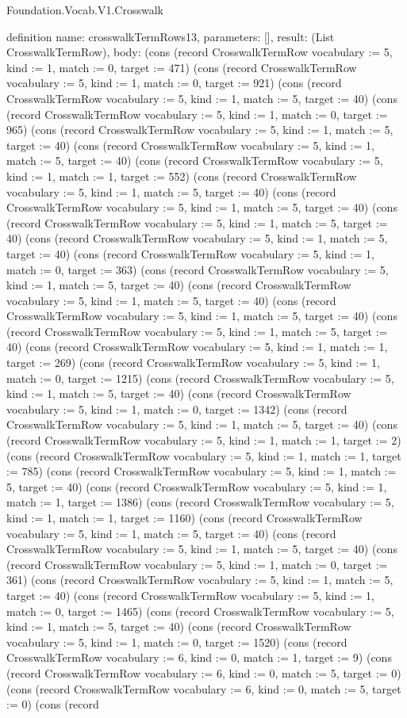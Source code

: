 \begin{lexlean}{Foundation.Vocab.V1.Crosswalk}
\begin{semanticmodule}
definition{
  name: crosswalkTermRows13,
  parameters: [],
  result: (List CrosswalkTermRow),
  body: (cons (record CrosswalkTermRow {vocabulary := 5, kind := 1, match := 0, target := 471}) (cons (record CrosswalkTermRow {vocabulary := 5, kind := 1, match := 0, target := 921}) (cons (record CrosswalkTermRow {vocabulary := 5, kind := 1, match := 5, target := 40}) (cons (record CrosswalkTermRow {vocabulary := 5, kind := 1, match := 0, target := 965}) (cons (record CrosswalkTermRow {vocabulary := 5, kind := 1, match := 5, target := 40}) (cons (record CrosswalkTermRow {vocabulary := 5, kind := 1, match := 5, target := 40}) (cons (record CrosswalkTermRow {vocabulary := 5, kind := 1, match := 1, target := 552}) (cons (record CrosswalkTermRow {vocabulary := 5, kind := 1, match := 5, target := 40}) (cons (record CrosswalkTermRow {vocabulary := 5, kind := 1, match := 5, target := 40}) (cons (record CrosswalkTermRow {vocabulary := 5, kind := 1, match := 5, target := 40}) (cons (record CrosswalkTermRow {vocabulary := 5, kind := 1, match := 5, target := 40}) (cons (record CrosswalkTermRow {vocabulary := 5, kind := 1, match := 0, target := 363}) (cons (record CrosswalkTermRow {vocabulary := 5, kind := 1, match := 5, target := 40}) (cons (record CrosswalkTermRow {vocabulary := 5, kind := 1, match := 5, target := 40}) (cons (record CrosswalkTermRow {vocabulary := 5, kind := 1, match := 5, target := 40}) (cons (record CrosswalkTermRow {vocabulary := 5, kind := 1, match := 5, target := 40}) (cons (record CrosswalkTermRow {vocabulary := 5, kind := 1, match := 1, target := 269}) (cons (record CrosswalkTermRow {vocabulary := 5, kind := 1, match := 0, target := 1215}) (cons (record CrosswalkTermRow {vocabulary := 5, kind := 1, match := 5, target := 40}) (cons (record CrosswalkTermRow {vocabulary := 5, kind := 1, match := 0, target := 1342}) (cons (record CrosswalkTermRow {vocabulary := 5, kind := 1, match := 5, target := 40}) (cons (record CrosswalkTermRow {vocabulary := 5, kind := 1, match := 1, target := 2}) (cons (record CrosswalkTermRow {vocabulary := 5, kind := 1, match := 1, target := 785}) (cons (record CrosswalkTermRow {vocabulary := 5, kind := 1, match := 5, target := 40}) (cons (record CrosswalkTermRow {vocabulary := 5, kind := 1, match := 1, target := 1386}) (cons (record CrosswalkTermRow {vocabulary := 5, kind := 1, match := 1, target := 1160}) (cons (record CrosswalkTermRow {vocabulary := 5, kind := 1, match := 5, target := 40}) (cons (record CrosswalkTermRow {vocabulary := 5, kind := 1, match := 5, target := 40}) (cons (record CrosswalkTermRow {vocabulary := 5, kind := 1, match := 0, target := 361}) (cons (record CrosswalkTermRow {vocabulary := 5, kind := 1, match := 5, target := 40}) (cons (record CrosswalkTermRow {vocabulary := 5, kind := 1, match := 0, target := 1465}) (cons (record CrosswalkTermRow {vocabulary := 5, kind := 1, match := 5, target := 40}) (cons (record CrosswalkTermRow {vocabulary := 5, kind := 1, match := 0, target := 1520}) (cons (record CrosswalkTermRow {vocabulary := 6, kind := 0, match := 1, target := 9}) (cons (record CrosswalkTermRow {vocabulary := 6, kind := 0, match := 5, target := 0}) (cons (record CrosswalkTermRow {vocabulary := 6, kind := 0, match := 5, target := 0}) (cons (record }
\end{semanticmodule}
\end{lexlean}
